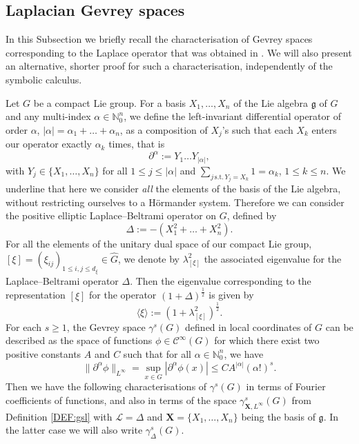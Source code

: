 \documentclass[12pt,oneside,a4paper]{book}
\numberwithin{equation}{section}     %
\theoremstyle{plain}
\theoremstyle{definition}
\newcommand{\N}{{\mathbb N}}
\newcommand{\slp}{{\mathcal L}}
\begin{document}
\subsection{Laplacian Gevrey spaces}\label{SSEC:laplacian}

In this Subsection we briefly recall the characterisation of Gevrey spaces corresponding to the Laplace operator that was obtained in \cite{DR2014}. We will also present an alternative, shorter proof for such a characterisation, independently of the symbolic calculus.

Let $G$ be a compact Lie group. For a basis $X_1,\dots,X_n$ of the Lie algebra $\mathfrak{g}$ of $G$ and any multi-index $\alpha\in\N^n_0$, we define the left-invariant differential operator of order $\alpha$, $|\alpha|=\alpha_1+\dots+\alpha_n$, as a composition of $X_j$'s such that each $X_k$ enters our operator exactly $\alpha_k$ times, that is
\[
\partial^\alpha:= Y_1\dots Y_{|\alpha|}, 
\]
with $Y_j\in\{X_1,\dots, X_n\}$ for all $1\leq j\leq |\alpha|$ and $\sum_{j\,\text{s.t.}\,Y_j=X_k}1=\alpha_k$, $1\leq k \leq n$. 
We underline that here we consider \textit{all} the elements of the basis of the Lie algebra, without restricting ourselves to a H\"ormander system. Therefore we can consider the positive elliptic {Laplace--Beltrami operator} on $G$, defined by
\[
\Delta:=-(X_1^2+\dots+X_n^2).
\]
For all the elements of the unitary dual space of our compact Lie group, $[\xi]=(\xi_{ij})_{1\leq i,j\leq d_{\xi}}\in\widehat G$, we denote by $\lambda^2_{[\xi]}$ the associated eigenvalue for the Laplace--Beltrami operator $\Delta$. Then the eigenvalue corresponding to the representation $[\xi]$ for the operator $(1+\Delta)^{\frac{1}{2}}$ is given by  
\[
\langle\xi\rangle:=(1+\lambda^2_{[\xi]})^{\frac{1}{2}}.
\] 
For each $s\geq 1$, the Gevrey space $\gamma^s(G)$ defined in local coordinates of $G$ can be described as the space of functions $\phi\in\mathcal{C}^\infty(G)$ for which there exist two positive constants $A$ and $C$ such that for all $\alpha\in\N^n_0$, we have
\[
\|\partial^\alpha \phi\|_{L^\infty}=\sup_{x\in G}|\partial^\alpha \phi(x)|\leq CA^{|\alpha|}(\alpha !)^s.
\]
Then we have the following characterisations of $\gamma^s(G)$ in terms of Fourier coefficients of functions, and also in terms of the space $\gamma^s_{\mathbf{X},L^{\infty}}(G)$ from Definition \ref{DEF:gsl} with $\slp=\Delta$ and $\mathbf{X}=\{X_1,\dots,X_n\}$ being the basis of $\mathfrak{g}$. In the latter case we will also write $\gamma^s_\Delta(G)$.
\end{document}
